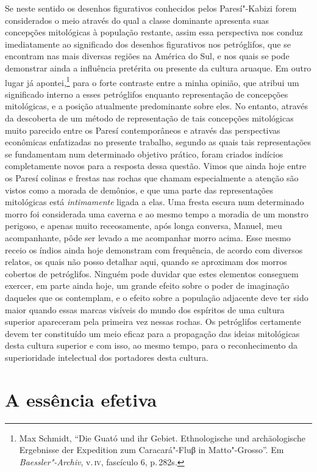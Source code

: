 Se neste sentido os desenhos figurativos conhecidos pelos Paresí"-Kabizi
forem considerados o meio através do qual a classe dominante apresenta
suas concepções mitológicas à população restante, assim essa
perspectiva nos conduz imediatamente ao significado dos desenhos
figurativos nos petróglifos, que se encontram nas mais diversas regiões
na América do Sul, e nos quais se pode demonstrar ainda a influência
pretérita ou presente da cultura aruaque. Em outro lugar já
apontei,\footnote{Max Schmidt, ``Die Guató und ihr Gebiet. Ethnologische
  und archäologische Ergebnisse der Expedition zum Caracará"-Fluβ in
  Matto"-Grosso''. Em
  \textit{Baessler"-Archiv}, v.\,\textsc{iv}, fascículo 6, p.\,282s.} para o forte
contraste entre a minha opinião, que atribui um significado interno a
esses petróglifos enquanto representação de concepções mitológicas, e a
posição atualmente predominante sobre eles. No entanto,
através da descoberta de um método de representação de tais concepções
mitológicas muito parecido entre os Paresí contemporâneos e através das
perspectivas econômicas enfatizadas no presente trabalho, segundo as
quais tais representações se fundamentam num determinado objetivo
prático, foram criados indícios completamente novos para a resposta
dessa questão. Vimos que ainda hoje entre os Paresí colinas e frestas
nas rochas que chamam especialmente a atenção são vistos como a morada
de demônios, e que uma parte das representações mitológicas está
\textit{intimamente} ligada a elas. Uma fresta escura num determinado morro foi
considerada uma caverna e ao mesmo tempo a moradia de um monstro
perigoso, e apenas muito receosamente, após longa conversa, Manuel, meu
acompanhante, pôde ser levado a me acompanhar morro acima. Esse mesmo
receio os índios ainda hoje demonstram com frequência, de acordo com
diversos relatos, os quais não posso detalhar aqui, quando se aproximam
dos morros cobertos de petróglifos. Ninguém pode duvidar que estes elementos 
conseguem exercer, em parte ainda hoje, um grande efeito
sobre o poder de imaginação daqueles que os contemplam, e o efeito
sobre a população adjacente deve ter sido maior quando essas marcas
visíveis do mundo dos espíritos de uma cultura superior apareceram pela
primeira vez nessas rochas. Os petróglifos certamente devem ter
constituído um meio eficaz para a propagação das ideias mitológicas
desta cultura superior e com isso, ao mesmo tempo, para o reconhecimento
da superioridade intelectual dos portadores desta cultura.



\chapter*{A essência efetiva\smallskip{}}

